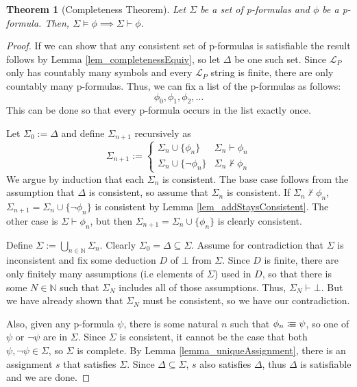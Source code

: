 \documentclass[leqno]{article}
\newtheorem{theorem}{Theorem}[section]
\newcommand{\N}{\mathbb{N}}
\newcommand{\set}[1]{\{#1\}}
\newcommand{\lang}{\mathcal{L}}
\newcommand{\proves}{\vdash}
\newcommand{\nproves}{\nvdash}
\newcommand{\is}{\colonequiv}
\begin{document}
\begin{theorem} [Completeness Theorem]
    Let $\Sigma$ be a set of p-formulas and $\phi$ be a p-formula. Then, $\Sigma \models \phi \implies \Sigma \proves \phi$.
\end{theorem}

\begin{proof}
   If we can show that any consistent set of p-formulas is satisfiable the result follows by Lemma \ref{lem_completenessEquiv}, so let $\Delta$ be one such set. Since $\lang_P$ only has countably many symbols and every $\lang_P$ string is finite, there are only countably many p-formulas. Thus, we can fix a list of the p-formulas as follows:
   \begin{equation*}
       \phi_0, \phi_1, \phi_2, \dots
   \end{equation*}
   This can be done so that every p-formula occurs in the list exactly once.
   
   Let $\Sigma_0 := \Delta$ and define $\Sigma_{n+1}$ recursively as
   \begin{equation*}
       \Sigma_{n+1} := \begin{cases}
       \Sigma_n \cup \set{\phi_n} & \Sigma_n \proves \phi_n \\
       \Sigma_n \cup \set{\neg \phi_n} & \Sigma_n \nproves \phi_n
       \end{cases}
   \end{equation*}
    We argue by induction that each $\Sigma_n$ is consistent. The base case follows from the assumption that $\Delta$ is consistent, so assume that $\Sigma_n$ is consistent. If $\Sigma_n \nproves \phi_n$, $\Sigma_{n+1} = \Sigma_n \cup \set{\neg \phi_n}$ is consistent by Lemma \ref{lem_addStaysConsistent}. The other case is $\Sigma \proves \phi_n$, but then $\Sigma_{n+1} = \Sigma_n \cup \set{\phi_n}$ is clearly consistent.
    
    Define $\Sigma := \bigcup_{n \in \N} \Sigma_n$. Clearly $\Sigma_0 = \Delta \subseteq \Sigma$. Assume for contradiction that $\Sigma$ is inconsistent and fix some deduction $D$ of $\bot$ from $\Sigma$. Since $D$ is finite, there are only finitely many assumptions (i.e elements of $\Sigma$) used in $D$, so that there is some $N \in \N$ such that $\Sigma_N$ includes all of those assumptions. Thus, $\Sigma_N \proves \bot$. But we have already shown that $\Sigma_N$ must be consistent, so we have our contradiction.
   
   Also, given any p-formula $\psi$, there is some natural $n$ such that $\phi_n \is \psi$, so one of $\psi$ or $\neg \psi$ are in $\Sigma$. Since $\Sigma$ is consistent, it cannot be the case that both $\psi, \neg \psi \in \Sigma$, so $\Sigma$ is complete. By Lemma \ref{lemma_uniqueAssignment}, there is an assignment $s$ that satisfies $\Sigma$. Since $\Delta \subseteq \Sigma$, $s$ also satisfies $\Delta$, thus $\Delta$ is satisfiable and we are done.
   
\end{proof}
\end{document}
